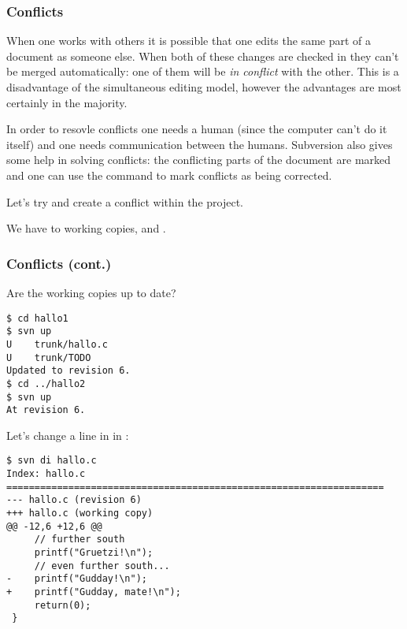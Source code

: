 \begin{frame}[fragile]
    \frametitle{Conflicts}
        When one works with others it is possible that one edits the same
        part of a document as someone else.  When both of these changes are
        checked in they can't be merged automatically: one of them will be
        \emph{in conflict} with the other.  This is a disadvantage of the
        simultaneous editing model, however the advantages are most
        certainly in the majority.

        In order to resovle conflicts one needs a human (since the computer
        can't do it itself) and one needs communication between the humans.
        Subversion also gives some help in solving conflicts: the
        conflicting parts of the document are marked and one can use the
         command to mark conflicts as being corrected.

        Let's try and create a conflict within the  project.

        We have to working copies,  and .
\end{frame}

\begin{frame}[fragile]
    \frametitle{Conflicts (cont.)}
    \linuxframe
        Are the working copies up to date?
\begin{lstlisting}[basicstyle=\tiny\ttfamily\color{black}]
$ cd hallo1
$ svn up
U    trunk/hallo.c
U    trunk/TODO
Updated to revision 6.
$ cd ../hallo2
$ svn up
At revision 6.
\end{lstlisting}

Let's change a line in  in :
\begin{lstlisting}[basicstyle=\tiny\ttfamily\color{black}]
$ svn di hallo.c
Index: hallo.c
===================================================================
--- hallo.c (revision 6)
+++ hallo.c (working copy)
@@ -12,6 +12,6 @@
     // further south
     printf("Gruetzi!\n");
     // even further south...
-    printf("Gudday!\n");
+    printf("Gudday, mate!\n");
     return(0);
 }
\end{lstlisting}
\end{frame}

